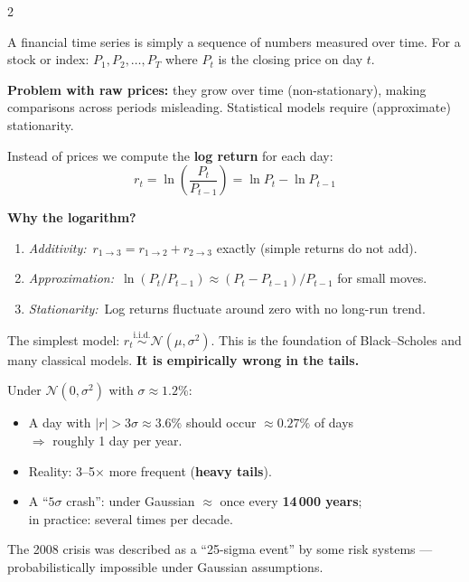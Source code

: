 \documentclass[10pt]{article}
\newcommand{\navybox}[2]{\begin{tcolorbox}[mybox={Navy}{LBg},title={#1}]#2\end{tcolorbox}}
\newcommand{\skybox}[2]{\begin{tcolorbox}[mybox={Sky}{BBg},title={#1}]#2\end{tcolorbox}}
\newcommand{\redbox}[2]{\begin{tcolorbox}[mybox={DRed}{RBg},title={#1}]#2\end{tcolorbox}}
\begin{document}
\begin{multicols}{2}

\navybox{What is a Financial Time Series?}{%
A financial time series is simply a sequence of numbers measured over time.
For a stock or index: $P_1, P_2, \ldots, P_T$ where $P_t$ is the closing price on day $t$.

\smallskip
\textbf{Problem with raw prices:} they grow over time (non-stationary), making comparisons across periods misleading. Statistical models require (approximate) stationarity.}

\skybox{Why Log Returns?}{%
Instead of prices we compute the \textbf{log return} for each day:
\begin{equation*}
  r_t = \ln\!\left(\frac{P_t}{P_{t-1}}\right) = \ln P_t - \ln P_{t-1}
\end{equation*}

\textbf{Why the logarithm?}
\begin{enumerate}
  \item \textit{Additivity:}\ $r_{1\to3} = r_{1\to2} + r_{2\to3}$ exactly (simple returns do not add).
  \item \textit{Approximation:}\ $\ln(P_t/P_{t-1}) \approx (P_t-P_{t-1})/P_{t-1}$ for small moves.
  \item \textit{Stationarity:}\ Log returns fluctuate around zero with no long-run trend.
\end{enumerate}}

\redbox{The Core Problem: Returns Are NOT Normal}{%
The simplest model: $r_t \overset{\text{i.i.d.}}{\sim} \mathcal{N}(\mu,\sigma^2)$.
This is the foundation of Black--Scholes and many classical models.
\textbf{It is empirically wrong in the tails.}

Under $\mathcal{N}(0,\sigma^2)$ with $\sigma \approx 1.2\%$:
\begin{itemize}
  \item A day with $|r| > 3\sigma \approx 3.6\%$ should occur $\approx 0.27\%$ of days \\ $\Rightarrow$ roughly 1 day per year.
  \item Reality: 3--5$\times$ more frequent (\textbf{heavy tails}).
  \item A ``$5\sigma$ crash'': under Gaussian $\approx$ once every \textbf{14\,000 years}; \\ in practice: several times per decade.
\end{itemize}
The 2008 crisis was described as a ``25-sigma event'' by some risk systems --- probabilistically impossible under Gaussian assumptions.}


\end{multicols}
\end{document}
